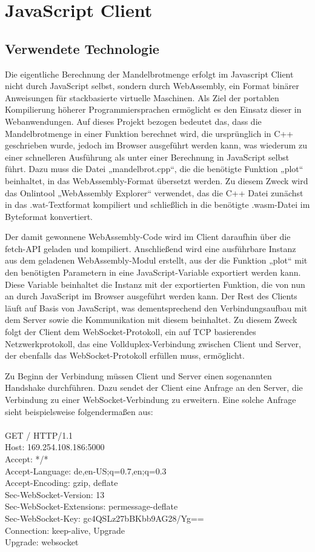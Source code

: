 \documentclass[12pt, onecolumn, notitlepage]{scrartcl}
\begin{document}
\section{JavaScript Client}
\subsection{Verwendete Technologie}
Die eigentliche Berechnung der Mandelbrotmenge erfolgt im Javascript Client nicht durch JavaScript selbst, sondern durch WebAssembly, ein Format binärer Anweisungen für stackbasierte virtuelle Maschinen. Als Ziel der portablen Kompilierung höherer Programmiersprachen ermöglicht es den Einsatz dieser in Webanwendungen. Auf dieses Projekt bezogen bedeutet das, dass die Mandelbrotmenge in einer Funktion berechnet wird, die ursprünglich in C++ geschrieben wurde, jedoch im Browser ausgeführt werden kann, was wiederum zu einer schnelleren Ausführung als unter einer Berechnung in JavaScript selbst führt. Dazu muss die Datei „mandelbrot.cpp“, die die benötigte Funktion „plot“ beinhaltet, in das WebAssembly-Format übersetzt werden. Zu diesem Zweck wird das Onlintool „WebAssembly Explorer“ verwendet, das die C++ Datei zunächst in das .wat-Textformat kompiliert und schließlich in die benötigte .wasm-Datei im Byteformat konvertiert. \par
Der damit gewonnene WebAssembly-Code wird im Client daraufhin über die fetch-API geladen und kompiliert. Anschließend wird eine ausführbare Instanz aus dem geladenen WebAssembly-Modul erstellt, aus der die Funktion „plot“ mit den benötigten Parametern in eine JavaScript-Variable exportiert werden kann. Diese Variable beinhaltet die Instanz mit der exportierten Funktion, die von nun an durch JavaScript im Browser ausgeführt werden kann.
Der Rest des Clients läuft auf Basis von JavaScript, was dementsprechend den Verbindungsaufbau mit dem Server sowie die Kommunikation mit diesem beinhaltet. Zu diesem Zweck folgt der Client dem WebSocket-Protokoll, ein auf TCP basierendes Netzwerkprotokoll, das eine Vollduplex-Verbindung zwischen Client und Server, der ebenfalls das WebSocket-Protokoll erfüllen muss, ermöglicht. \par
Zu Beginn der Verbindung müssen Client und Server einen sogenannten Handshake durchführen. Dazu sendet der Client eine Anfrage an den Server, die Verbindung zu einer WebSocket-Verbindung zu erweitern. Eine solche Anfrage sieht beispielsweise folgendermaßen aus: \\ \\
GET / HTTP/1.1 \\
Host: 169.254.108.186:5000 \\
Accept: */* \\
Accept-Language: de,en-US;q=0.7,en;q=0.3 \\
Accept-Encoding: gzip, deflate \\
Sec-WebSocket-Version: 13 \\
Sec-WebSocket-Extensions: permessage-deflate \\
Sec-WebSocket-Key: gc4QSLz27bBKbb9AG28/Yg== \\
Connection: keep-alive, Upgrade \\
Upgrade: websocket \\
\end{document}
